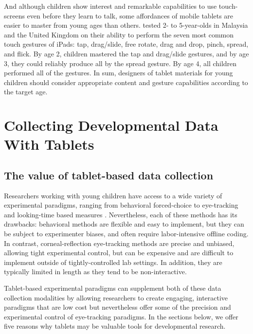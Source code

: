 \documentclass[man,noapacite]{apa2}
\begin{document}
And although children show interest and remarkable capabilities to use touch-screens even before they learn to talk, some affordances of mobile tablets are easier to master from young ages than others.  tested 2- to 5-year-olds in Malaysia and the United Kingdom on their ability to perform the seven most common touch gestures of iPads: tap, drag/slide, free rotate, drag and drop, pinch, spread, and flick. By age 2, children mastered the tap and drag/slide gestures, and by age 3, they could reliably produce all by the spread gesture. By age 4, all children performed all of the gestures. In sum, designers of tablet materials for young children should consider appropriate content and gesture capabilities according to the target age.

\section{Collecting Developmental Data With Tablets}

\subsection{The value of tablet-based data collection}

Researchers working with young children have access to a wide variety of experimental paradigms, ranging from behavioral forced-choice to eye-tracking and looking-time based measures \cite{aslin2007,gredeback2009}. Nevertheless, each of these methods has its drawbacks: behavioral methods are flexible and easy to implement, but they can be subject to experimenter biases, and often require labor-intensive offline coding. In contrast, corneal-reflection eye-tracking methods are precise and unbiased, allowing tight experimental control, but can be expensive and are difficult to implement outside of tightly-controlled lab settings. In addition, they are typically limited in length as they tend to be non-interactive.

Tablet-based experimental paradigms can supplement both of these data collection modalities by allowing researchers to create engaging, interactive paradigms that are low cost but nevertheless offer some of the precision and experimental control of eye-tracking paradigms. In the sections below, we offer five reasons why tablets may be valuable tools for developmental research.
\end{document}
